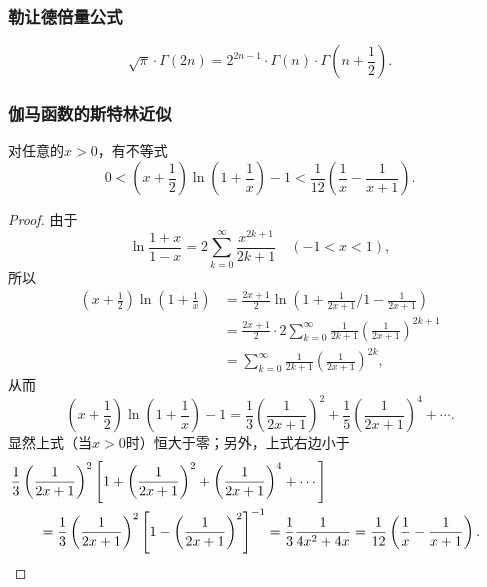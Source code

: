 \subsubsection{勒让德倍量公式}
\begin{theorem}[勒让德倍量公式]
\begin{equation}\label{equation:定积分.勒让德倍量公式}
\sqrt{\pi} \cdot \Gamma(2n)
= 2^{2n-1} \cdot \Gamma(n) \cdot \Gamma\left(n+\frac{1}{2}\right).
\end{equation}
\end{theorem}

\subsubsection{伽马函数的斯特林近似}
\begin{lemma}\label{theorem:定积分.伽马函数的斯特灵近似.引理1}
对任意的\(x>0\)，有不等式\begin{equation}\label{equation:定积分.伽马函数的斯特灵近似.引理1}
0 < \left(x+\frac{1}{2}\right) \ln(1+\frac{1}{x}) - 1 < \frac{1}{12}\left(\frac{1}{x}-\frac{1}{x+1}\right).
\end{equation}
\begin{proof}
由于\[
\ln\frac{1+x}{1-x}
= 2 \sum\limits_{k=0}^{\infty} \frac{x^{2k+1}}{2k+1}
\quad(-1<x<1),
\]所以\begin{align*}
\left(x+\frac{1}{2}\right) \ln(1+\frac{1}{x})
&= \frac{2x+1}{2} \ln({1+\frac{1}{2x+1}}\Bigg/{1-\frac{1}{2x+1}}) \\
&= \frac{2x+1}{2} \cdot
2 \sum\limits_{k=0}^{\infty} \frac{1}{2k+1} \left(\frac{1}{2x+1}\right)^{2k+1} \\
&= \sum\limits_{k=0}^{\infty} \frac{1}{2k+1} \left(\frac{1}{2x+1}\right)^{2k},
\end{align*}从而\[
\left(x+\frac{1}{2}\right) \ln(1+\frac{1}{x}) - 1
= \frac{1}{3} \left(\frac{1}{2x+1}\right)^2
+ \frac{1}{5} \left(\frac{1}{2x+1}\right)^4
+ \dotsb.
\]显然上式（当\(x>0\)时）恒大于零；另外，上式右边小于\begin{align*}
&\hspace{-20pt}
\frac{1}{3} \left(\frac{1}{2x+1}\right)^2 \left[
1 + \left(\frac{1}{2x+1}\right)^2 + \left(\frac{1}{2x+1}\right)^4 + \dotsb
\right] \\
&= \frac{1}{3} \left(\frac{1}{2x+1}\right)^2 \left[
1 - \left(\frac{1}{2x+1}\right)^2
\right]^{-1}
= \frac{1}{3} \frac{1}{4x^2 + 4x}
= \frac{1}{12} \left(\frac{1}{x} - \frac{1}{x+1}\right).
\qedhere
\end{align*}
\end{proof}
\end{lemma}

